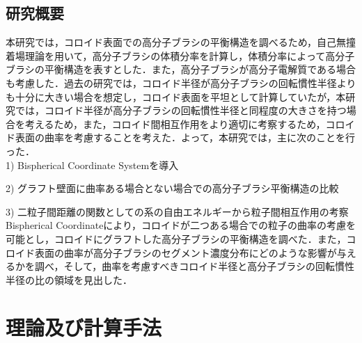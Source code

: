 \documentclass[10.5pt,a4j]{jarticle}
\begin{document}
\subsection{研究概要}
本研究では，コロイド表面での高分子ブラシの平衡構造を調べるため，自己無撞着場理論を用いて，高分子ブラシの体積分率を計算し，体積分率によって高分子ブラシの平衡構造を表すとした．また，高分子ブラシが高分子電解質である場合も考慮した．過去の研究\cite{paper1}\cite{paper2}では，コロイド半径が高分子ブラシの回転慣性半径よりも十分に大きい場合を想定し，コロイド表面を平坦として計算していたが，本研究では，コロイド半径が高分子ブラシの回転慣性半径と同程度の大きさを持つ場合を考えるため，また，コロイド間相互作用をより適切に考察するため，コロイド表面の曲率を考慮することを考えた．よって，本研究では，主に次のことを行った．\\

1) Bispherical Coordinate Systemを導入

2) グラフト壁面に曲率ある場合とない場合での高分子ブラシ平衡構造の比較

3) 二粒子間距離の関数としての系の自由エネルギーから粒子間相互作用の考察\\

Bispherical Coordinateにより，コロイドが二つある場合での粒子の曲率の考慮を可能とし，コロイドにグラフトした高分子ブラシの平衡構造を調べた．また，コロイド表面の曲率が高分子ブラシのセグメント濃度分布にどのような影響が与えるかを調べ，そして，曲率を考慮すべきコロイド半径と高分子ブラシの回転慣性半径の比の領域を見出した．

\newpage
\section{理論及び計算手法}
\end{document}
